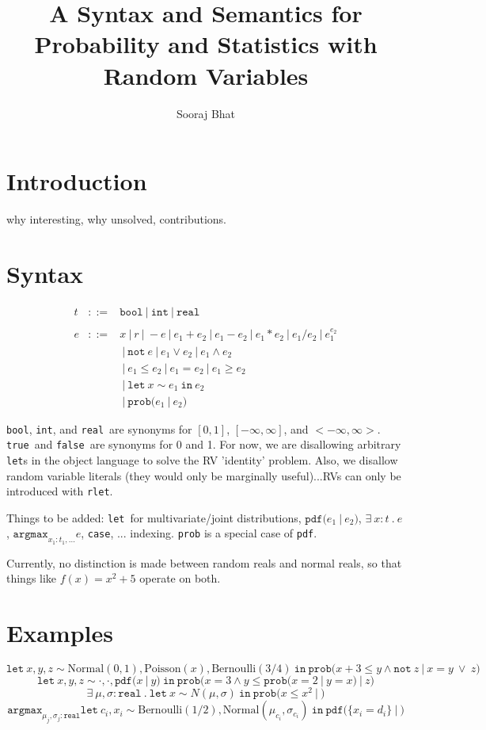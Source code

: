 \documentclass{article}
\title{A Syntax and Semantics for\\Probability and Statistics with Random Variables}
\author{Sooraj Bhat}
\newcommand{\E}[1]{\ensuremath{#1}}
\newcommand{\T}[1]{\texttt{#1}}
\newcommand{\rbool}{\T{bool}}
\newcommand{\rint}{\T{int}}
\newcommand{\rreal}{\T{real}}
\newcommand{\true}{\T{true}}
\newcommand{\false}{\T{false}}
\newcommand{\rlet}[3]{\E{\T{let}\ #1 \sim #2 \ \T{in}\ #3}}
\newcommand{\pdf}[2]{\E{\T{pdf(} #1 \ | \ #2 \T{)}}}
\newcommand{\prob}[2]{\E{\T{prob(} #1 \ | \ #2 \T{)}}}
\newcommand{\thereis}[3]{\E{\exists\ #1 : #2 \ . \ #3}}
\newcommand{\Not}{\T{not}}
\newcommand{\argmax}[2]{\E{\T{argmax}_{#1} #2}}
\newcommand{\case}{\T{case}}
\begin{document}
\maketitle
\section{Introduction}
%
why interesting, why unsolved, contributions.
%
\section{Syntax}
% 
\begin{eqnarray*}
t & ::= & \rbool \ | \ \rint \ | \ \rreal \\ %
& & \\
e & ::= & x \ | \ r 
    \ | \ -e \ | \ e_1 + e_2 \ | \ e_1 - e_2 
    \ | \ e_1 * e_2 \ | \ e_1 / e_2 \ | \ e_1^{e_2} \\
& & \ | \ \Not\ e \ | \ e_1 \vee e_2 \ | \ e_1 \wedge e_2 \\
& & \ | \ e_1 \leq e_2 \ | \ e_1 = e_2 \ | \ e_1 \geq e_2 \\
& & \ | \ \rlet{x}{e_1}{e_2} \\
& & \ | \ \prob{e_1}{e_2} 
\end{eqnarray*}

\rbool, \rint, and \rreal\ are synonyms for $[0,1]$,
$[-\infty,\infty]$, and $<-\infty,\infty>$. \true\ and \false\ are
synonyms for 0 and 1.  For now, we are disallowing arbitrary {\tt
let}s in the object language to solve the RV 'identity' problem.
Also, we disallow random variable literals (they would only be
marginally useful)...RVs can only be introduced with \T{rlet}.

Things to be added: \T{let}\ for multivariate/joint distributions,
\pdf{e_1}{e_2}, \thereis{x}{t}{e}, \argmax{x_1:t_1,\ldots}{e}, \case,
... indexing. \T{prob} is a special case of \T{pdf}.

Currently, no distinction is made between random reals and normal
reals, so that things like $f(x) = x^2 + 5$ operate on both.

\section{Examples}
%
\[ \rlet{x,y,z}{\mathrm{Normal}(0,1),\mathrm{Poisson}(x),\mathrm{Bernoulli}(3/4)}
       {\prob{x+3\leq y \wedge \Not\ z}{x=y \ \vee \ z}} \]
%
\[ \rlet{x,y,z}{\cdot,\cdot,\pdf{x}{y}}
   {\prob{x=3 \wedge y\leq\prob{x=2}{y=x}}{z}} \]
%
\[ \thereis{\mu,\sigma}{\rreal}{\rlet{x}{N(\mu,\sigma)}{\prob{x\leq x^2}{}}} \]
%
\[ \argmax{\mu_j,\sigma_j:\rreal}{ %
  \rlet{c_i,x_i}{\mathrm{Bernoulli}(1/2),\mathrm{Normal}(\mu_{c_i},\sigma_{c_i})}
       {\pdf{\{x_i=d_i\}}{}}
} \]
\end{document}
